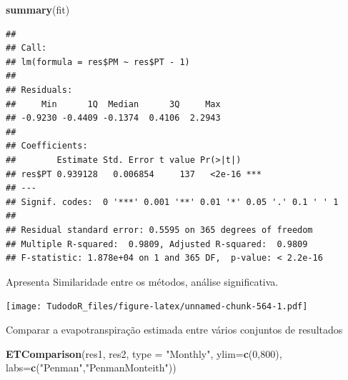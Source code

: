 \documentclass[
]{book}
\newenvironment{Shaded}{\begin{snugshade}}{\end{snugshade}}
\newcommand{\DataTypeTok}[1]{\textcolor[rgb]{0.13,0.29,0.53}{#1}}
\newcommand{\DecValTok}[1]{\textcolor[rgb]{0.00,0.00,0.81}{#1}}
\newcommand{\KeywordTok}[1]{\textcolor[rgb]{0.13,0.29,0.53}{\textbf{#1}}}
\newcommand{\NormalTok}[1]{#1}
\newcommand{\OperatorTok}[1]{\textcolor[rgb]{0.81,0.36,0.00}{\textbf{#1}}}
\newcommand{\StringTok}[1]{\textcolor[rgb]{0.31,0.60,0.02}{#1}}
\begin{document}
\begin{Shaded}
\begin{Highlighting}[]
\KeywordTok{summary}\NormalTok{(fit)}
\end{Highlighting}
\end{Shaded}

\begin{verbatim}
## 
## Call:
## lm(formula = res$PM ~ res$PT - 1)
## 
## Residuals:
##     Min      1Q  Median      3Q     Max 
## -0.9230 -0.4409 -0.1374  0.4106  2.2943 
## 
## Coefficients:
##        Estimate Std. Error t value Pr(>|t|)    
## res$PT 0.939128   0.006854     137   <2e-16 ***
## ---
## Signif. codes:  0 '***' 0.001 '**' 0.01 '*' 0.05 '.' 0.1 ' ' 1
## 
## Residual standard error: 0.5595 on 365 degrees of freedom
## Multiple R-squared:  0.9809, Adjusted R-squared:  0.9809 
## F-statistic: 1.878e+04 on 1 and 365 DF,  p-value: < 2.2e-16
\end{verbatim}

Apresenta Similaridade entre os métodos, análise significativa.

\begin{Shaded}
\end{Shaded}

\texttt{[image: TudodoR\_files/figure-latex/unnamed-chunk-564-1.pdf]}

Comparar a evapotranspiração estimada entre vários conjuntos de resultados

\begin{Shaded}
\begin{Highlighting}[]
\KeywordTok{ETComparison}\NormalTok{(res1, res2, }\DataTypeTok{type =} \StringTok{"Monthly"}\NormalTok{, }\DataTypeTok{ylim=}\KeywordTok{c}\NormalTok{(}\DecValTok{0}\NormalTok{,}\DecValTok{800}\NormalTok{),}
             \DataTypeTok{labs=}\KeywordTok{c}\NormalTok{(}\StringTok{"Penman"}\NormalTok{,}\StringTok{"PenmanMonteith"}\NormalTok{))}
\end{Highlighting}
\end{Shaded}
\end{document}
